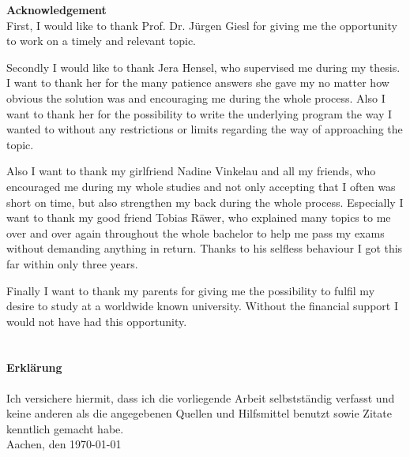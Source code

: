 {\bf\Large Acknowledgement} \\ [1em] 

First, I would like to thank Prof. Dr. Jürgen Giesl for giving me the opportunity to work on a timely and relevant topic.

Secondly I would like to thank Jera Hensel, who supervised me during my thesis. I want to thank her for the many patience answers she gave my no matter how obvious the solution was and encouraging me during the whole process. Also I want to thank her for the possibility to write the underlying program the way I wanted to without any restrictions or limits regarding the way of approaching the topic. 

Also I want to thank my girlfriend Nadine Vinkelau and all my friends, who encouraged me during my whole studies and not only accepting that I often was short on time, but also strengthen my back during the whole process. Especially I want to thank my good friend Tobias Räwer, who explained many topics to me over and over again throughout the whole bachelor to help me pass my exams without demanding anything in return. Thanks to his selfless behaviour I got this far within only three years.

Finally I want to thank my parents for giving me the possibility to fulfil my desire to study at a worldwide known university. Without the financial support I would not have had this opportunity. \\ \\

\paragraph{Erklärung} Ich versichere hiermit, dass ich die vorliegende Arbeit selbstständig verfasst und keine
anderen als die angegebenen Quellen und Hilfsmittel benutzt sowie Zitate kenntlich
gemacht habe.\newline \\
Aachen, den \today

